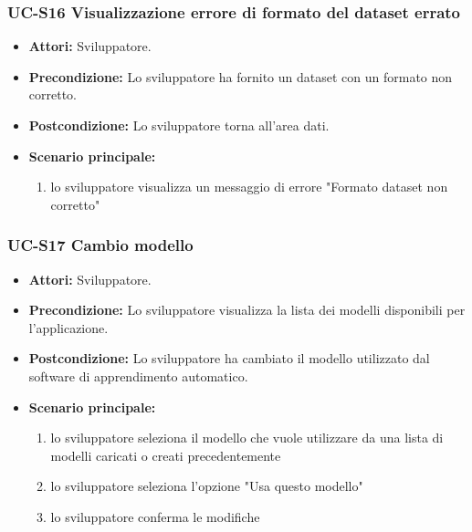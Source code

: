 	\subsubsection{UC-S16 Visualizzazione errore di formato del dataset errato}	
	\begin{itemize}					
			\item \textbf{Attori:} Sviluppatore.
			\item \textbf{Precondizione:} Lo sviluppatore ha fornito un dataset con un formato non corretto.
			\item \textbf{Postcondizione:} Lo sviluppatore torna all'area dati.
			\item \textbf{Scenario principale:}
				\begin{enumerate}
					\item lo sviluppatore visualizza un messaggio di errore "Formato dataset non corretto"
				\end{enumerate}	
		\end{itemize}		
	
	\subsubsection{UC-S17 Cambio modello}
	\begin{itemize}					
			\item \textbf{Attori:} Sviluppatore.
			\item \textbf{Precondizione:} Lo sviluppatore visualizza la lista dei modelli disponibili per l'applicazione.
			\item \textbf{Postcondizione:} Lo sviluppatore ha cambiato il modello utilizzato dal software di apprendimento automatico.
			\item \textbf{Scenario principale:}
				\begin{enumerate}
					\item lo sviluppatore seleziona il modello che vuole utilizzare da una lista di modelli caricati o creati precedentemente
					\item lo sviluppatore seleziona l'opzione "Usa questo modello"
					\item lo sviluppatore conferma le modifiche
				\end{enumerate}	
		\end{itemize}		
	
